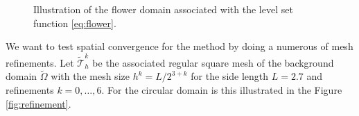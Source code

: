 \begin{figure}[h!]
    \centering
{}
\caption{Illustration of the flower domain associated with the level set function \eqref{eq:flower}.}
    \label{fig:flower}
\end{figure}


We want to test spatial convergence for the method by doing a numerous of mesh refinements. Let $ \widetilde{\mathcal{T}}_{h}^{k} $ be the associated regular square mesh of the background domain $\widetilde{\Omega }$ with the mesh size  $h^{k} = L/2^{3+k} $
for the side length $L=2.7$ and refinements
$k=0, \ldots, 6$. For the circular domain is this illustrated in the Figure \ref{fig:refinement}.

